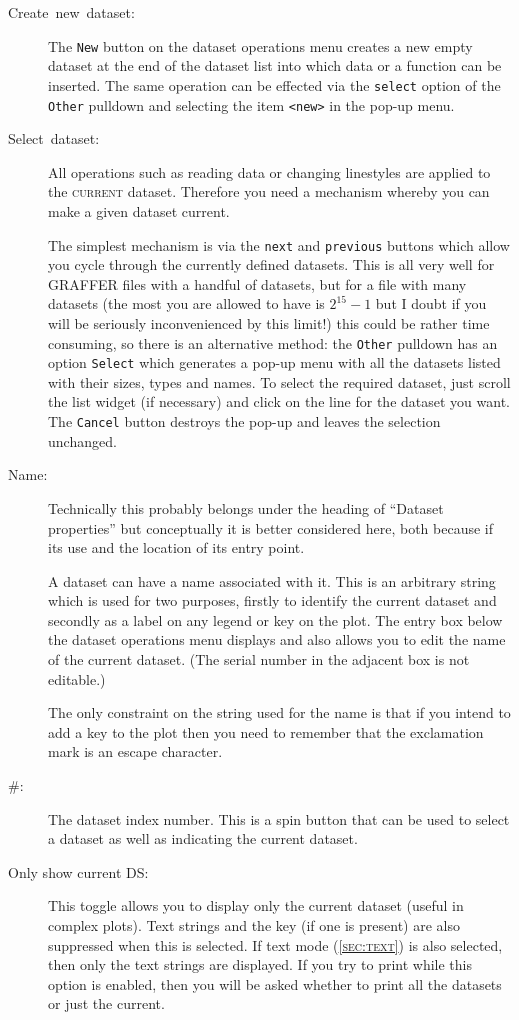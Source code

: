 \documentclass[11pt,twoside,english]{article}
\begin{document}
\begin{description}
\item [Create~new~dataset\label{make-new-ds}:]The \texttt{New} button
  on the dataset operations menu creates a new empty dataset at the end
  of the dataset list into which data or a function can be inserted.
  The same operation can be effected via the \texttt{select} option of
  the \texttt{Other} pulldown and selecting the item \texttt{<new>} in
  the pop-up menu.
\item [Select~dataset:]All operations such as reading data or changing
  linestyles are applied to the \textsc{current} dataset. Therefore you
  need a mechanism whereby you can make a given dataset current.


  The simplest mechanism is via the \texttt{next} and \texttt{previous}
  buttons which allow you cycle through the currently defined datasets.
  This is all very well for GRAFFER files with a handful of datasets,
  but for a file with many datasets (the most you are allowed to have
  is $2^{15}-1$ but I doubt if you will be seriously inconvenienced by
  this limit!) this could be rather time consuming, so there is an
  alternative method: the \texttt{Other} pulldown has an option
  \texttt{Select} which generates a pop-up menu with all the datasets
  listed with their sizes, types and names. To select the required
  dataset, just scroll the list widget (if necessary) and click on the
  line for the dataset you want. The \texttt{Cancel} button
  destroys the pop-up and leaves the selection unchanged.

\item [Name:]Technically this probably belongs under the heading of
  {}``Dataset properties'' but conceptually it is better considered
  here, both because if its use and the location of its entry point.


  A dataset can have a name associated with it. This is an arbitrary
  string which is used for two purposes, firstly to identify the
  current dataset and secondly as a label on any legend or key on the
  plot.  The entry box below the dataset operations menu displays and
  also allows you to edit the name of the current dataset. (The serial
  number in the adjacent box is not editable.)

  The only constraint on the string used for the name is that if you
  intend to add a key to the plot then you need to remember that the
  exclamation mark is an escape character.
\item[\#:] The dataset index number. This is a spin button that can be
  used to select a dataset as well as indicating the current dataset.

\item[Only show current DS:] This toggle allows you to display only the
  current dataset (useful in complex plots). Text strings and the key
  (if one is present) are also suppressed when this is selected. If
  text mode (\textsc{\autoref{sec:text}}) is also selected, then only the
  text strings are displayed. If you try to print while this option is
  enabled, then you will be asked whether to print all the datasets or
  just the current.

\end{description}
\end{document}

